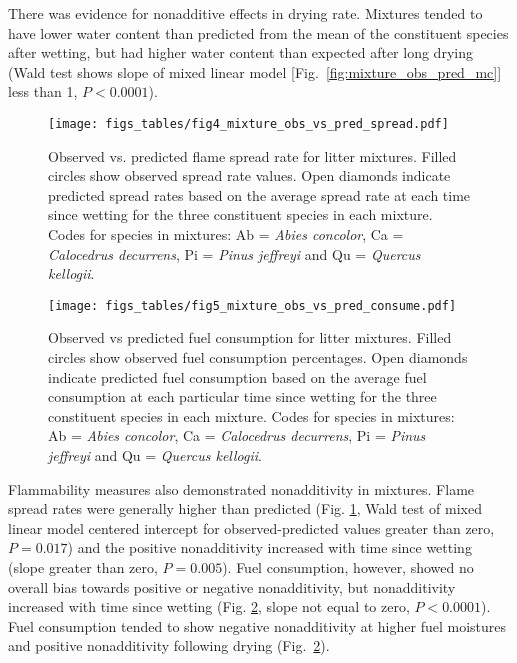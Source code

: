 \documentclass[letterpaper,12pt]{article}
\begin{document}
There was evidence for nonadditive effects in drying rate. Mixtures tended to
have lower water content than predicted from the mean of the constituent
species after wetting, but had higher water content than expected after long
drying (Wald test shows slope of mixed linear model
[Fig.~\ref{fig:mixture_obs_pred_mc}] less than 1, $P < 0.0001$).


\begin{figure}[h]
  \centering
\texttt{[image: figs\_tables/fig4\_mixture\_obs\_vs\_pred\_spread.pdf]}
\caption{Observed vs. predicted flame spread rate for litter mixtures. Filled
  circles show observed spread rate values. Open diamonds indicate predicted
  spread rates based on the average spread rate at each time since wetting for
  the three constituent species in each mixture. Codes for species in mixtures:
  Ab = \emph{Abies concolor}, Ca = \emph{Calocedrus decurrens}, Pi =
  \emph{Pinus jeffreyi} and Qu = \emph{Quercus kellogii}.}
  \label{fig:mixture_obs_pred_spread}
\end{figure}


\begin{figure}[h]
  \centering
\texttt{[image: figs\_tables/fig5\_mixture\_obs\_vs\_pred\_consume.pdf]}
\caption{Observed vs predicted fuel consumption for litter mixtures. Filled
  circles show observed fuel consumption percentages. Open diamonds indicate
  predicted fuel consumption based on the average fuel consumption at each
  particular time since wetting for the three constituent species in each
  mixture. Codes for species in mixtures: Ab = \emph{Abies concolor}, Ca =
  \emph{Calocedrus decurrens}, Pi = \emph{Pinus jeffreyi} and Qu =
  \emph{Quercus kellogii}.}
  \label{fig:mixture_obs_pred_consume}
\end{figure}


Flammability measures also demonstrated nonadditivity in mixtures. Flame spread
rates were generally higher than predicted (Fig.
\ref{fig:mixture_obs_pred_spread}, Wald test of mixed linear model centered
intercept for observed-predicted values greater than zero, $P = 0.017$) and the
positive nonadditivity increased with time since wetting (slope greater than
zero, $P = 0.005$). Fuel consumption, however, showed no overall bias towards
positive or negative nonadditivity, but nonadditivity increased with time since
wetting (Fig. \ref{fig:mixture_obs_pred_consume}, slope not equal to zero,
$P < 0.0001$). Fuel consumption tended to show negative nonadditivity at higher
fuel moistures and positive nonadditivity following drying
(Fig.~\ref{fig:mixture_obs_pred_consume}).
\end{document}
